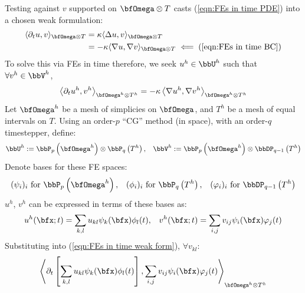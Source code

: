 \begin{example}
        Testing against $v$ supported on $\bfOmega\otimes T$ casts (\ref{eqn:FEs in time PDE}) into a chosen weak formulation:
        \begin{align}
            \langle\partial_{t}u, v\rangle_{\bfOmega\otimes T}  &=  \kappa\langle\Delta u, v\rangle_{\bfOmega\otimes T}  \\
                                                                &=   - \kappa\langle\nabla u, \nabla v\rangle_{\bfOmega\otimes T}  \impliedby  {\rm (\ref{eqn:FEs in time BC})}
        \end{align}
        To solve this via FEs in time therefore, we seek $u^{h}  \in  \bbU^{h}$ such that $\forall  v^{h}  \in  \bbV^{h}$,
        \begin{equation}\label{eqn:FEs in time weak form}
            \left\langle\partial_{t}u^{h}, v^{h}\right\rangle_{\bfOmega^{h}\otimes T^{h}}  =  - \kappa\left\langle\nabla u^{h}, \nabla v^{h}\right\rangle_{\bfOmega^{h}\otimes T^{h}}
        \end{equation}
        Let $\bfOmega^{h}$ be a mesh of simplicies on $\bfOmega$, and $T^{h}$ be a mesh of equal intervals on $T$. Using an order-$p$ ``CG'' method (in space), with an order-$q$ timestepper, define:
        \begin{align}
            \bbU^{h}  :=  \bbP_{p}\left(\bfOmega^{h}\right)\otimes\bbP_{q}\left(T^{h}\right),  &&
            \bbV^{h}  :=  \bbP_{p}\left(\bfOmega^{h}\right)\otimes\bbDP_{q - 1}\left(T^{h}\right)
        \end{align}
        Denote bases for these FE spaces:
        \begin{align}
            (\psi_{i})_{i}     \text{ for }  \bbP_{p}\left(\bfOmega^{h}\right),  &&
            (\phi_{i})_{i}     \text{ for }  \bbP_{q}\left(T^{h}\right),         &&
            (\varphi_{i})_{i}  \text{ for }  \bbDP_{q - 1}\left(T^{h}\right)
        \end{align}
        $u^{h}$, $v^{h}$ can be expressed in terms of these bases as:
        \begin{align}
            u^{h}(\bfx; t)  =  \sum_{k, l}u_{kl}\psi_{k}(\bfx)\phi_{l}(t),  &&
            v^{h}(\bfx; t)  =  \sum_{i, j}v_{ij}\psi_{i}(\bfx)\varphi_{j}(t)
        \end{align}
        Substituting into (\ref{eqn:FEs in time weak form}), $\forall  v_{kl}$:
        \begin{multline}
            \left\langle\partial_{t}\left[\sum_{k, l}u_{kl}\psi_{k}(\bfx)\phi_{l}(t)\right], \sum_{i, j}v_{ij}\psi_{i}(\bfx)\varphi_{j}(t)\right\rangle_{\bfOmega^{h}\otimes T^{h}}  \\

\end{multline}
\end{example}
